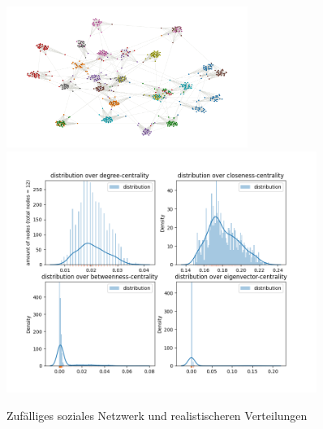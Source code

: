 \FloatBarrier
\begin{figure}[h!]%
  \centering
  \includegraphics[width=0.7\textwidth]{Graphics/newourSN.png}
  \includegraphics[width=0.9\textwidth]{Graphics/newOurDist.png}
  \caption{Zufälliges soziales Netzwerk und realistischeren Verteilungen}
  \label{fig:distributionALL}
\end{figure}
\FloatBarrier
